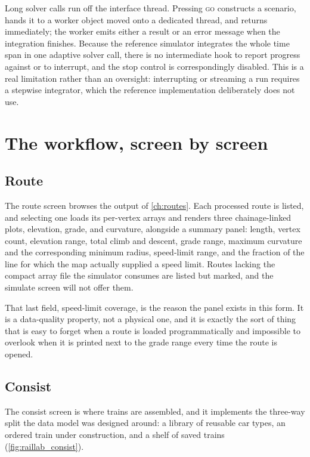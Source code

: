 Long solver calls run off the interface thread. Pressing \textsc{go} constructs a scenario, hands it to a worker object moved onto a dedicated thread, and returns immediately; the worker emits either a result or an error message when the integration finishes. Because the reference simulator integrates the whole time span in one adaptive solver call, there is no intermediate hook to report progress against or to interrupt, and the stop control is correspondingly disabled. This is a real limitation rather than an oversight: interrupting or streaming a run requires a stepwise integrator, which the reference implementation deliberately does not use.

\section{The workflow, screen by screen}
\label{sec:raillab_screens}

\subsection{Route}

The route screen browses the output of \cref{ch:routes}. Each processed route is listed, and selecting one loads its per-vertex arrays and renders three chainage-linked plots, elevation, grade, and curvature, alongside a summary panel: length, vertex count, elevation range, total climb and descent, grade range, maximum curvature and the corresponding minimum radius, speed-limit range, and the fraction of the line for which the map actually supplied a speed limit. Routes lacking the compact array file the simulator consumes are listed but marked, and the simulate screen will not offer them.

That last field, speed-limit coverage, is the reason the panel exists in this form. It is a data-quality property, not a physical one, and it is exactly the sort of thing that is easy to forget when a route is loaded programmatically and impossible to overlook when it is printed next to the grade range every time the route is opened.

\subsection{Consist}

The consist screen is where trains are assembled, and it implements the three-way split the data model was designed around: a library of reusable car types, an ordered train under construction, and a shelf of saved trains (\cref{fig:raillab_consist}).

